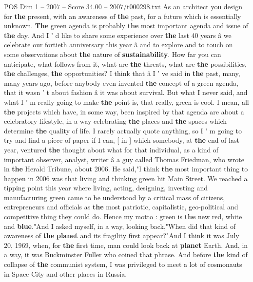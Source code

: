 \begin{textsample}{POS Dim 1 – 2007 – Score 34.00 – 2007/t000298.txt}  \label{ex:f1_pos_020}
As an architect you design for \textbf{the} present, with an awareness of \textbf{the} past, for a future which is essentially unknown. \textbf{The} green agenda is probably \textbf{the} most important agenda and issue of \textbf{the} day.
And I ' d like to share some experience over \textbf{the} last 40 years â we celebrate our fortieth anniversary this year â and to explore and to touch on some observations about \textbf{the} nature of \textbf{sustainability}.
How far you can anticipate, what follows from it, what are \textbf{the} threats, what are \textbf{the} possibilities, \textbf{the} challenges, \textbf{the} opportunities?
I think that â I ' ve said in \textbf{the} past, many, many years ago, before anybody even invented \textbf{the} concept of a green agenda, that it wasn ' t about fashion â it was about survival.
But what I never said, and what I ' m really going to make \textbf{the} point is, that really, green is cool.
I mean, all \textbf{the} projects which have, in some way, been inspired by that agenda are about a celebratory lifestyle, in a way celebrating \textbf{the} places and \textbf{the} spaces which determine \textbf{the} quality of life.
I rarely actually quote anything, so I ' m going to try and find a piece of paper if I can, [ in ] which somebody, at \textbf{the} end of last year, ventured \textbf{the} thought about what for that individual, as a kind of important observer, analyst, writer â a guy called Thomas Friedman, who wrote in \textbf{the} Herald Tribune, about 2006.
He said,"I think \textbf{the} most important thing to happen in 2006 was that living and thinking green hit Main Street.
We reached a tipping point this year where living, acting, designing, investing and manufacturing green came to be understood by a critical mass of citizens, entrepreneurs and officials as \textbf{the} most patriotic, capitalistic, geo-political and competitive thing they could do.
Hence my motto : green is \textbf{the} new red, white and \textbf{blue}."And I asked myself, in a way, looking back,"When did that kind of awareness of \textbf{the} \textbf{planet} and its fragility first appear?"And I think it was July 20, 1969, when, for \textbf{the} first time, man could look back at \textbf{planet} Earth.
And, in a way, it was Buckminster Fuller who coined that phrase.
And before \textbf{the} kind of collapse of \textbf{the} communist system, I was privileged to meet a lot of cosmonauts in Space City and other places in Russia.

\end{textsample}
